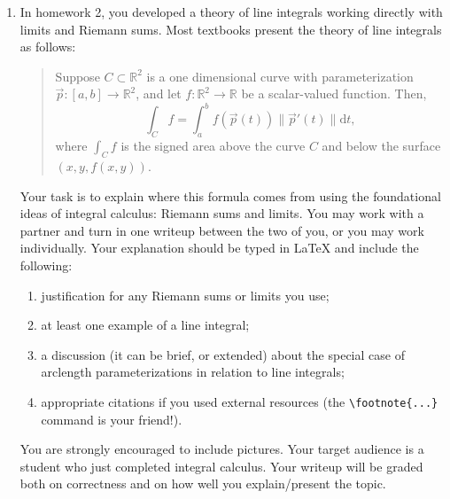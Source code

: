 \documentclass[letter]{article}
\newcommand{\R}{\mathbb{R}}
\begin{document}
\begin{enumerate}
		\item In homework 2, you developed a theory of line integrals working directly with limits
			and Riemann sums.  Most textbooks present the theory of line integrals as follows:
			\begin{quote}
				Suppose $C\subset \R^2$ is a one dimensional curve with parameterization
				$\vec p:[a,b]\to \R^2$, and let $f:\R^2\to \R$ be a scalar-valued function.
				Then,
				\[
					\int_C f = \int_a^b f(\vec p(t))\|\vec p'(t)\|\mathrm{d}t,
				\]
				where $\int_C f$ is the signed area above the curve $C$ and below the surface
				$(x,y,f(x,y))$.
			\end{quote}

			Your task is to explain where this formula comes from using the foundational ideas of integral
			calculus: Riemann sums and limits.  You may work with a partner and turn in one writeup
			between the two of you, or you may work individually. 
			Your explanation should be typed in \LaTeX{} and include
			the following:
			\begin{enumerate}
				\item justification for any Riemann sums or limits you use;
				\item at least one example of a line integral;
				\item a discussion (it can be brief, or extended) about the special case of arclength
					parameterizations in relation to line integrals;
				\item appropriate citations if you used external resources (the \verb|\footnote{...}|
					command is your friend!).
			\end{enumerate}
			You are strongly encouraged to include pictures.  Your target audience is a student
			who just completed integral calculus.  
			Your writeup will be graded both on correctness
			and on how well you explain/present the topic.
	\end{enumerate}
\end{document}
